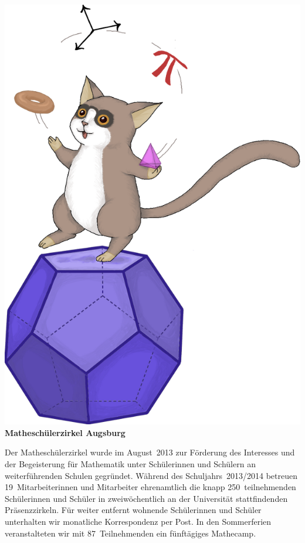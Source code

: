 \documentclass[12pt]{zettel}
\begin{document}
\pagestyle{plain}

\renewcommand{\betreff}{}


\vspace{-2em}

\begin{center}
{\qquad\quad}\includegraphics[scale=0.18]{cover}\\[1cm]

  \Large\textbf{\textsf{Matheschülerzirkel Augsburg}}
\end{center}

\vspace{1em}

Der Matheschülerzirkel wurde im August~2013 zur Förderung des
Interesses und der Begeisterung für Mathematik unter Schülerinnen und Schülern
an weiterführenden Schulen gegründet. Während des Schuljahrs~2013/2014 betreuen
19~Mitarbeiterinnen und Mitarbeiter ehrenamtlich die knapp
250~teilnehmenden Schülerinnen und Schüler in zweiwöchentlich an der
Universität stattfindenden Präsenzzirkeln. Für weiter entfernt wohnende Schülerinnen
und Schüler unterhalten wir monatliche Korrespondenz per Post. In den
Sommerferien veranstalteten wir mit 87~Teilnehmenden ein fünftägiges Mathecamp.
\end{document}
